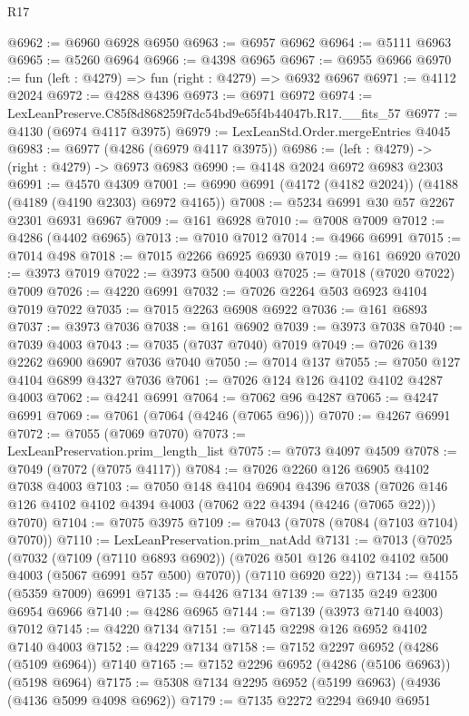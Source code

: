 \begin{lexlean}{R17}
\begin{coremodule}
@6962 := @6960 @6928 @6950
@6963 := @6957 @6962
@6964 := @5111 @6963
@6965 := @5260 @6964
@6966 := @4398 @6965
@6967 := @6955 @6966
@6970 := fun (left : @4279) => fun (right : @4279) => @6932 @6967
@6971 := @4112 @2024
@6972 := @4288 @4396
@6973 := @6971 @6972
@6974 := LexLeanPreserve.C85f8d868259f7dc54bd9e65f4b44047b.R17.__fits_57
@6977 := @4130 (@6974 @4117 @3975)
@6979 := LexLeanStd.Order.mergeEntries @4045
@6983 := @6977 (@4286 (@6979 @4117 @3975))
@6986 := (left : @4279) -> (right : @4279) -> @6973 @6983
@6990 := @4148 @2024 @6972 @6983 @2303
@6991 := @4570 @4309
@7001 := @6990 @6991 (@4172 (@4182 @2024)) (@4188 (@4189 (@4190 @2303) @6972 @4165))
@7008 := @5234 @6991 @30 @57 @2267 @2301 @6931 @6967
@7009 := @161 @6928
@7010 := @7008 @7009
@7012 := @4286 (@4402 @6965)
@7013 := @7010 @7012
@7014 := @4966 @6991
@7015 := @7014 @498
@7018 := @7015 @2266 @6925 @6930
@7019 := @161 @6920
@7020 := @3973 @7019
@7022 := @3973 @500 @4003
@7025 := @7018 (@7020 @7022) @7009
@7026 := @4220 @6991
@7032 := @7026 @2264 @503 @6923 @4104 @7019 @7022
@7035 := @7015 @2263 @6908 @6922
@7036 := @161 @6893
@7037 := @3973 @7036
@7038 := @161 @6902
@7039 := @3973 @7038
@7040 := @7039 @4003
@7043 := @7035 (@7037 @7040) @7019
@7049 := @7026 @139 @2262 @6900 @6907 @7036 @7040
@7050 := @7014 @137
@7055 := @7050 @127 @4104 @6899 @4327 @7036
@7061 := @7026 @124 @126 @4102 @4102 @4287 @4003
@7062 := @4241 @6991
@7064 := @7062 @96 @4287
@7065 := @4247 @6991
@7069 := @7061 (@7064 (@4246 (@7065 @96)))
@7070 := @4267 @6991
@7072 := @7055 (@7069 @7070)
@7073 := LexLeanPreservation.prim_length_list
@7075 := @7073 @4097 @4509
@7078 := @7049 (@7072 (@7075 @4117))
@7084 := @7026 @2260 @126 @6905 @4102 @7038 @4003
@7103 := @7050
    @148
    @4104
    @6904
    @4396
    @7038
    (@7026 @146 @126 @4102 @4102 @4394 @4003 (@7062 @22 @4394 (@4246 (@7065 @22))) @7070)
@7104 := @7075 @3975
@7109 := @7043 (@7078 (@7084 (@7103 @7104) @7070))
@7110 := LexLeanPreservation.prim_natAdd
@7131 := @7013
    (@7025
      (@7032
        (@7109 (@7110 @6893 @6902))
        (@7026 @501 @126 @4102 @4102 @500 @4003 (@5067 @6991 @57 @500) @7070))
      (@7110 @6920 @22))
@7134 := @4155 (@5359 @7009) @6991
@7135 := @4426 @7134
@7139 := @7135 @249 @2300 @6954 @6966
@7140 := @4286 @6965
@7144 := @7139 (@3973 @7140 @4003) @7012
@7145 := @4220 @7134
@7151 := @7145 @2298 @126 @6952 @4102 @7140 @4003
@7152 := @4229 @7134
@7158 := @7152 @2297 @6952 (@4286 (@5109 @6964)) @7140
@7165 := @7152 @2296 @6952 (@4286 (@5106 @6963)) (@5198 @6964)
@7175 := @5308 @7134 @2295 @6952 (@5199 @6963) (@4936 (@4136 @5099 @4098 @6962))
@7179 := @7135 @2272 @2294 @6940 @6951

\end{coremodule}
\end{lexlean}
